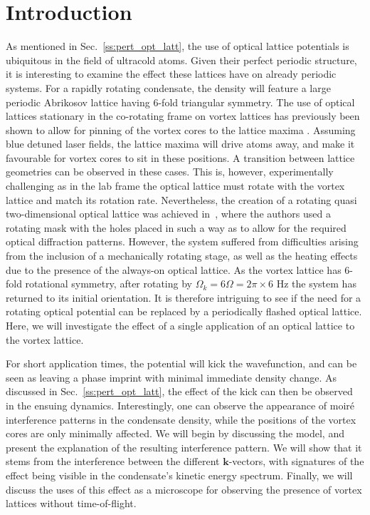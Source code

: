 \section{Introduction}

As mentioned in Sec.~\ref{ss:pert_opt_latt}, the use of optical lattice potentials is ubiquitous in the field of ultracold atoms. Given their perfect periodic structure, it is interesting to examine the effect these lattices have on already periodic systems. For a rapidly rotating condensate, the density will feature a large periodic Abrikosov lattice having $6$-fold triangular symmetry. The use of optical lattices stationary in the co-rotating frame on vortex lattices has previously been shown to allow for pinning of the vortex cores to the lattice maxima \cite{OL:Reijnders_prl_2004,Vtx:Tung_prl_2006}. Assuming blue detuned laser fields, the lattice maxima will drive atoms away, and make it favourable for vortex cores to sit in these positions. A transition between lattice geometries can be observed in these cases. This is, however, experimentally challenging as in the lab frame the optical lattice must rotate with the vortex lattice and match its rotation rate. Nevertheless, the creation of a rotating quasi two-dimensional optical lattice was achieved in~\cite{Vtx:Tung_prl_2006}, where the authors used a rotating mask with the holes placed in such a way as to allow for the required optical diffraction patterns. However, the system suffered from difficulties arising from the inclusion of a mechanically rotating stage, as well as the heating effects due to the presence of the always-on optical lattice. As the vortex lattice has 6-fold rotational symmetry, after rotating by
$\Omega_{k}=6\Omega=2\pi\times 6$ Hz the system has returned to its initial orientation. It is therefore intriguing to see if the need for a rotating optical potential can be replaced by a periodically flashed optical lattice. Here, we will investigate the effect of a single application of an optical lattice to the vortex lattice.

 For short application times, the potential will kick the wavefunction, and can be seen as leaving a phase imprint with minimal immediate density change. As discussed in Sec.~\ref{ss:pert_opt_latt}, the effect of the kick can then be observed in the ensuing dynamics. Interestingly, one can observe the appearance of moir\'e interference patterns in the condensate density, while the positions of the vortex cores are only minimally affected. We will begin by discussing the model, and present the explanation of the resulting interference pattern. We will show that it stems from the interference between the different $\mathbf{k}$-vectors, with signatures of the effect being visible in the condensate's kinetic energy spectrum. Finally, we will discuss the uses of this effect as a microscope for observing the presence of vortex lattices without time-of-flight.

